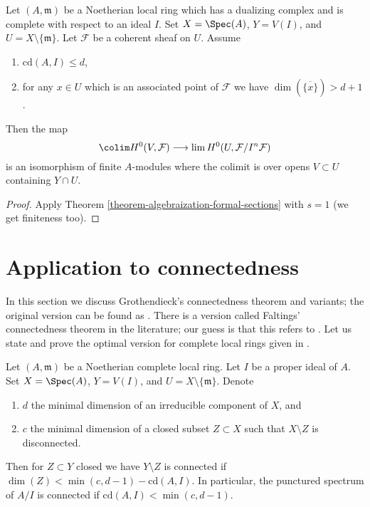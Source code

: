 \begin{lemma}
\label{lemma-application-theorem}
Let $(A, \mathfrak m)$ be a Noetherian local ring which has a
dualizing complex and is complete with respect to an ideal $I$.
Set $X = \Spec(A)$, $Y = V(I)$, and $U = X \setminus \{\mathfrak m\}$.
Let $\mathcal{F}$ be a coherent sheaf on $U$.
Assume
\begin{enumerate}
\item $\text{cd}(A, I) \leq d$,
\item for any $x \in U$ which is an associated point of $\mathcal{F}$
we have $\dim(\overline{\{x\}}) > d + 1$.
\end{enumerate}
Then the map
$$
\colim H^0(V, \mathcal{F})
\longrightarrow
\lim H^0(U, \mathcal{F}/I^n\mathcal{F})
$$
is an isomorphism of finite $A$-modules
where the colimit is over opens $V \subset U$
containing $Y \cap U$.
\end{lemma}

\begin{proof}
Apply Theorem \ref{theorem-algebraization-formal-sections} with $s = 1$
(we get finiteness too).
\end{proof}





\section{Application to connectedness}
\label{section-connected}

\noindent
In this section we discuss Grothendieck's connectedness theorem
and variants; the original version can be found as
\cite[Exposee XIII, Theorem 2.1]{SGA2}. There is a version
called Faltings' connectedness theorem in the literature;
our guess is that this refers to \cite[Theorem 6]{Faltings-some}.
Let us state and prove the optimal version for complete
local rings given in \cite[Theorem 1.6]{Varbaro}.

\begin{lemma}
\label{lemma-punctured-still-connected}
\begin{reference}
\cite[Theorem 1.6]{Varbaro}
\end{reference}
Let $(A, \mathfrak m)$ be a Noetherian complete local ring.
Let $I$ be a proper ideal of $A$.
Set $X = \Spec(A)$, $Y = V(I)$, and $U = X \setminus \{\mathfrak m\}$.
Denote
\begin{enumerate}
\item $d$ the minimal dimension of an irreducible component of $X$, and
\item $c$ the minimal dimension of a closed subset $Z \subset X$
such that $X \setminus Z$ is disconnected.
\end{enumerate}
Then for $Z \subset Y$ closed we have $Y \setminus Z$ is connected if
$\dim(Z) < \min(c, d - 1) - \text{cd}(A, I)$. In particular, the punctured
spectrum of $A/I$ is connected if $\text{cd}(A, I) < \min(c, d - 1)$.
\end{lemma}

